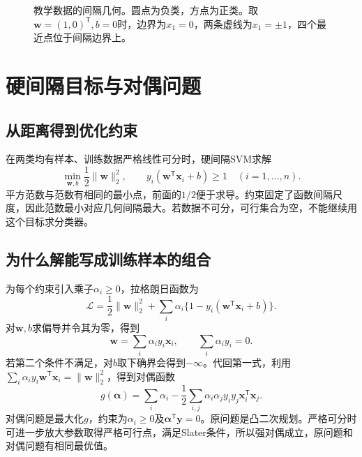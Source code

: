 \begin{figure}[htbp]
\centering
{}
\caption{教学数据的间隔几何。圆点为负类，方点为正类。取$\bm w=(1,0)^{\mathsf T},b=0$时，边界为$x_1=0$，两条虚线为$x_1=\pm1$，四个最近点位于间隔边界上。}
\label{fig:svm-margin-geometry}
\end{figure}

\section{硬间隔目标与对偶问题}
\subsection{从距离得到优化约束}
在两类均有样本、训练数据严格线性可分时，硬间隔SVM求解
\begin{equation}
 \min_{\bm w,b}\frac12\|\bm w\|_2^2,
 \qquad y_i(\bm w^{\mathsf T}\bm x_i+b)\ge1\quad(i=1,\ldots,n).
 \label{eq:svm-hard-margin-primal}
\end{equation}
平方范数与范数有相同的最小点，前面的$1/2$便于求导。约束固定了函数间隔尺度，因此范数最小对应几何间隔最大。若数据不可分，可行集合为空，不能继续用这个目标求分类器。

\subsection{为什么解能写成训练样本的组合}
为每个约束引入乘子$\alpha_i\ge0$，拉格朗日函数为
\begin{equation}
 \mathcal L=\frac12\|\bm w\|_2^2
 +\sum_i\alpha_i\{1-y_i(\bm w^{\mathsf T}\bm x_i+b)\}.
\end{equation}
对$\bm w,b$求偏导并令其为零，得到
\begin{equation}
 \bm w=\sum_i\alpha_i y_i\bm x_i,
 \qquad \sum_i\alpha_i y_i=0.
 \label{eq:svm-stationarity}
\end{equation}
若第二个条件不满足，对$b$取下确界会得到$-\infty$。代回第一式，利用$\sum_i\alpha_i y_i\bm w^{\mathsf T}\bm x_i=\|\bm w\|_2^2$，得到对偶函数
\begin{equation}
 g(\bm\alpha)=\sum_i\alpha_i-
 \frac12\sum_{i,j}\alpha_i\alpha_j y_i y_j\bm x_i^{\mathsf T}\bm x_j.
\end{equation}
对偶问题是最大化$g$，约束为$\alpha_i\ge0$及$\bm\alpha^{\mathsf T}\bm y=0$。原问题是凸二次规划。严格可分时可进一步放大参数取得严格可行点，满足Slater条件，所以强对偶成立，原问题和对偶问题有相同最优值。

